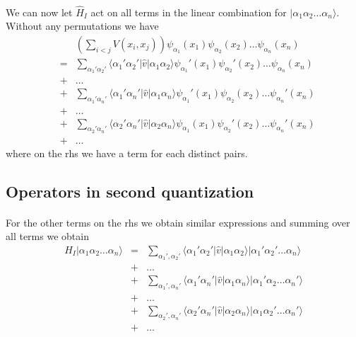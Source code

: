 \documentclass[%
twoside,                 %
final,                   %
10pt]{article}
\begin{document}
\paragraph{}
We can now let $\hat{H}_I$ act on all terms in the linear combination for $|\alpha_1\alpha_2\dots\alpha_n\rangle$. Without any permutations we have
\begin{eqnarray}
	&& \left( \sum_{i < j} V(x_i,x_j) \right) \psi_{\alpha_1}(x_1)\psi_{\alpha_2}(x_2)\dots \psi_{\alpha_n}(x_n) \nonumber \\
	&=& \sum_{\alpha_1'\alpha_2'} \langle \alpha_1'\alpha_2'|\hat{v}|\alpha_1\alpha_2\rangle
		\psi_{\alpha_1}'(x_1)\psi_{\alpha_2}'(x_2)\dots \psi_{\alpha_n}(x_n) \nonumber \\
	& +& \dots \nonumber \\
	&+& \sum_{\alpha_1'\alpha_n'} \langle \alpha_1'\alpha_n'|\hat{v}|\alpha_1\alpha_n\rangle
		\psi_{\alpha_1}'(x_1)\psi_{\alpha_2}(x_2)\dots \psi_{\alpha_n}'(x_n) \nonumber \\
	& +& \dots \nonumber \\
	&+& \sum_{\alpha_2'\alpha_n'} \langle \alpha_2'\alpha_n'|\hat{v}|\alpha_2\alpha_n\rangle
		\psi_{\alpha_1}(x_1)\psi_{\alpha_2}'(x_2)\dots \psi_{\alpha_n}'(x_n) \nonumber \\
	 & +& \dots \label{eq:2-33}
\end{eqnarray}
where on the rhs we have a term for each distinct pairs.






\subsection*{Operators in second quantization}

\paragraph{}
For the other terms on the rhs we obtain similar expressions  and summing over all terms we obtain
\begin{eqnarray}
	H_I |\alpha_1\alpha_2\dots\alpha_n\rangle &=& \sum_{\alpha_1', \alpha_2'} \langle \alpha_1'\alpha_2'|\hat{v}|\alpha_1\alpha_2\rangle
		|\alpha_1'\alpha_2'\dots\alpha_n\rangle \nonumber \\
	&+& \dots \nonumber \\
	&+& \sum_{\alpha_1', \alpha_n'} \langle \alpha_1'\alpha_n'|\hat{v}|\alpha_1\alpha_n\rangle
		|\alpha_1'\alpha_2\dots\alpha_n'\rangle \nonumber \\
	&+& \dots \nonumber \\
	&+& \sum_{\alpha_2', \alpha_n'} \langle \alpha_2'\alpha_n'|\hat{v}|\alpha_2\alpha_n\rangle
		|\alpha_1\alpha_2'\dots\alpha_n'\rangle \nonumber \\
	 &+& \dots \label{eq:2-34}
\end{eqnarray}
\end{document}
